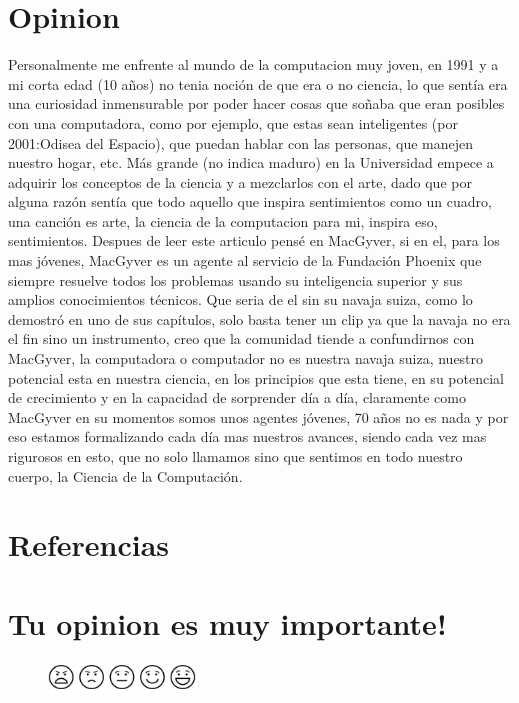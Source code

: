 \documentclass[12pt,letterpaper]{article}
\begin{document}
\section{Opinion}
Personalmente me enfrente al mundo de la computacion muy joven, en 1991 y a mi corta edad (10 años) no tenia noción de que era o no ciencia, lo que sentía era una curiosidad inmensurable por poder hacer cosas que soñaba que eran posibles con una computadora, como por ejemplo, que estas sean inteligentes (por 2001:Odisea del Espacio\autocite{SpaceOdyssey}), que puedan hablar con las personas, que manejen nuestro hogar, etc. Más grande (no indica maduro) en la Universidad empece a adquirir los conceptos de la ciencia y a mezclarlos con el arte, dado que por alguna razón sentía que todo aquello que inspira sentimientos como un cuadro, una canción es arte, la ciencia de la computacion para mi, inspira eso, sentimientos. Despues de leer este articulo pensé en MacGyver\autocite{MacGyver}, si en el, para los mas jóvenes, MacGyver es un agente al servicio de la Fundación Phoenix que siempre resuelve todos los problemas usando su inteligencia superior y sus amplios conocimientos técnicos. Que seria de el sin su navaja suiza\autocite{NavajaSuiza}, como lo demostró en uno de sus capítulos\autocite{usarClip}, solo basta tener un clip\autocite{clip}\autocite{kitDeSupervivencia} ya que la navaja no era el fin sino un instrumento, creo que la comunidad tiende a confundirnos con MacGyver, la computadora o computador no es nuestra navaja suiza, nuestro potencial esta en nuestra ciencia, en los principios que esta tiene, en su potencial de crecimiento y en la capacidad de sorprender día a día, claramente como MacGyver en su momentos somos unos agentes jóvenes, 70 años no es nada y por eso estamos formalizando cada día mas nuestros avances, siendo cada vez mas rigurosos en esto, que no solo llamamos sino que sentimos en todo nuestro cuerpo, la Ciencia de la Computación.

\section{Referencias\label{sec:references}}

\printbibliography[heading=none]

\section{Tu opinion es muy importante!}
\begin{figure}
    \centering
    \includegraphics[width=4cm]{./images/vote.png}
    \captionsetup{justification=centering, singlelinecheck=false}
\end{figure}
\end{document}
